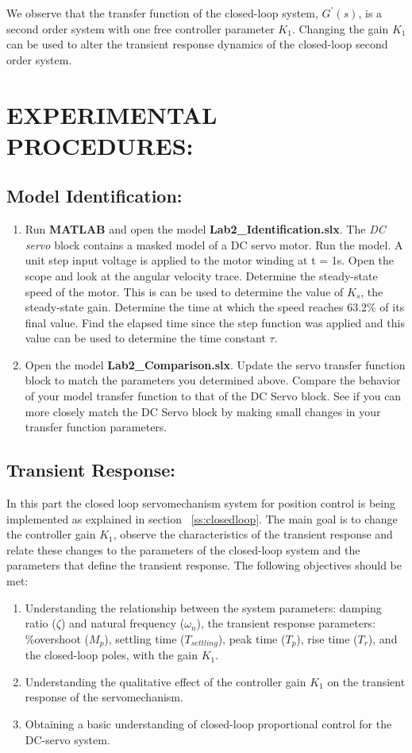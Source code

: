 \documentclass[11pt,a4paper]{article}
\begin{document}
We observe that the transfer function of the closed-loop system, $G^{\prime}(s)$, is a second order system with one free controller parameter $K_{1}$. Changing the gain $K_{1}$ can be used to alter the transient response dynamics of the closed-loop second order system.

\section{EXPERIMENTAL PROCEDURES:}
\subsection{Model Identification:}
\begin{enumerate}
\item Run \textbf{MATLAB} and open the model \textbf{Lab2\_Identification.slx}. The \textit{DC servo} block contains a masked model of a DC servo motor. Run the model. A unit step input voltage is applied to the motor winding at t = 1s. Open the scope and look at the angular velocity trace. Determine the steady-state speed of the motor. This is can be used to determine the value of $K_{s}$, the steady-state gain. Determine the time at which the speed reaches 63.2\% of its final value. Find the elapsed time since the step function was applied and this value can be used to determine the time constant $\tau$.
\item Open the model \textbf{Lab2\_Comparison.slx}. Update the servo transfer function block to match the parameters you determined above. Compare the behavior of your model transfer function to that of the DC Servo block. See if you can more closely match the DC Servo block by making small changes in your transfer function parameters.
\end{enumerate}

\subsection{Transient Response:}
In this part the closed loop servomechanism system for position control is being implemented as explained in section ~\ref{ss:closedloop}. The main goal is to change the controller gain $K_{1}$, observe the characteristics of the transient response and relate these changes to the parameters of the closed-loop system and the parameters that define the transient response.
The following objectives should be met:
\begin{enumerate}
\item Understanding the relationship between the system parameters: damping ratio ($\zeta$) and natural frequency ($\omega_{n}$), the transient response parameters: \%overshoot ($M_{p}$), settling time ($T_{settling}$), peak time ($T_{p}$), rise time ($T_{r}$), and the closed-loop poles, with the gain $K_{1}$.

\item Understanding the qualitative effect of the controller gain $K_{1}$ on the transient response of the servomechanism.

\item Obtaining a basic understanding of closed-loop proportional control for the DC-servo system.
\end{enumerate}
\end{document}
